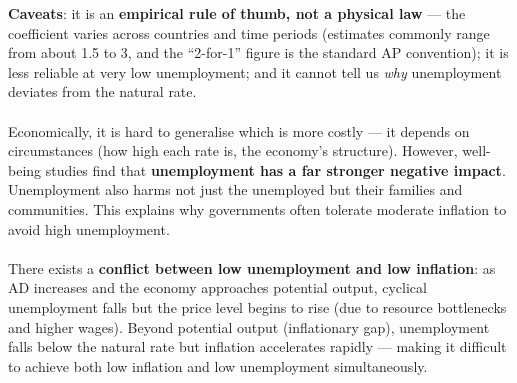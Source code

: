 \documentclass[a4paper,12pt]{article}
\begin{document}
\textbf{Caveats}: it is an \textbf{empirical rule of thumb, not a physical law} --- the coefficient varies across countries and time periods (estimates commonly range from about 1.5 to 3, and the ``2-for-1'' figure is the standard AP convention); it is less reliable at very low unemployment; and it cannot tell us \textit{why} unemployment deviates from the natural rate.
\\\\
Economically, it is hard to generalise which is more costly --- it depends on circumstances (how high each rate is, the economy's structure). However, well-being studies find that \textbf{unemployment has a far stronger negative impact}. Unemployment also harms not just the unemployed but their families and communities. This explains why governments often tolerate moderate inflation to avoid high unemployment.\\\\
There exists a \textbf{conflict between low unemployment and low inflation}: as AD increases and the economy approaches potential output, cyclical unemployment falls but the price level begins to rise (due to resource bottlenecks and higher wages). Beyond potential output (inflationary gap), unemployment falls below the natural rate but inflation accelerates rapidly --- making it difficult to achieve both low inflation and low unemployment simultaneously.
\end{document}
